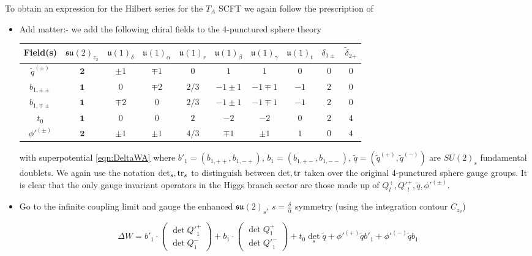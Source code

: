 \documentclass[main.tex]{subfiles}
\begin{document}
To obtain an expression for the Hilbert series for the $T_A$ SCFT we again follow the prescription of \cite{Razamat:2016dpl}
\begin{itemize}
\item {Add matter:- we add the following chiral fields to the 4-punctured sphere theory
\begin{table}[htb!]
\centering
\begin{tabular}{|c |c|c|c|c|c|c|c|c| c|} 
 \hline
 Field(s) &$\mathfrak{su}(2)_{z_2}$&$\mathfrak{u}(1)_{\delta}$&$\mathfrak{u}(1)_{\alpha}$&$\mathfrak{u}(1)_{r}$&$\mathfrak{u}(1)_{\beta}$&$\mathfrak{u}(1)_{\gamma}$&$\mathfrak{u}(1)_{t}$&$\delta_{1\pm}$&$\widetilde{\delta}_{2\dot+}$\\[2pt] 
  \hline\hline
$\widetilde{q}^{(\pm)}$&$\mathbf{2}$&$\pm1$&$\mp1$&$0$&$1$&$1$&$0$&$0$&$0$\\
$b_{1,\pm\pm}$&$\mathbf{1}$&$0$&$\mp2$&$2/3$&$-1\pm1$&$-1\mp1$&$-1$&$2$&$0$\\
$b_{1,\mp\pm}$&$\mathbf{1}$&$\mp2$&$0$&$2/3$&$-1\pm1$&$-1\mp1$&$-1$&$2$&$0$\\
$t_0$&$\mathbf{1}$&$0$&$0$&$2$&$-2$&$-2$&$0$&$2$&$4$\\
${\phi'}^{(\pm)}$&$\mathbf{2}$&$\pm1$&$\pm1$&$4/3$&$\mp1$&$\pm1$&$1$&$0$&$4$\\\hline
\end{tabular}
\end{table}}
with superpotential \eqref{eqn:DeltaWA} where $b'_1=(b_{1,++},b_{1,-+})$, \newline$b_1=(b_{1,+-},b_{1,--})$, $\widetilde{q}=(\widetilde{q}^{(+)},\widetilde{q}^{(-)})$ are $SU(2)_s$ fundamental doublets. We again use the notation $\det_s, \operatorname{tr}_s$ to distinguish between $\det,\operatorname{tr}$ taken over the original 4-punctured sphere gauge groups.
It is clear that the only gauge invariant operators in the Higgs branch sector are those made up of $Q_{l}^+,{Q'}_{l}^+,\widetilde{q},{\phi'}^{(\pm)}$. 
\item Go to the infinite coupling limit and gauge the enhanced $\mathfrak{su}(2)_s$, $s=\frac{\delta}{\alpha}$ symmetry (using the integration contour $C_{z_2}$)
\end{itemize}
\begin{equation}\label{eqn:DeltaWA}
\Delta W=b'_1\cdot\begin{pmatrix}\det {Q'}_1^+\\\det {Q}_1^-\end{pmatrix}+b_{1}\cdot\begin{pmatrix}\det Q_1^+\\\det {Q'}_1^-\end{pmatrix}+t_0\det_s  \widetilde{q}+{\phi'}^{(+)}\widetilde{q}b'_{1}+{\phi'}^{(-)}\widetilde{q}b_{1}
\end{equation}
\end{document}
